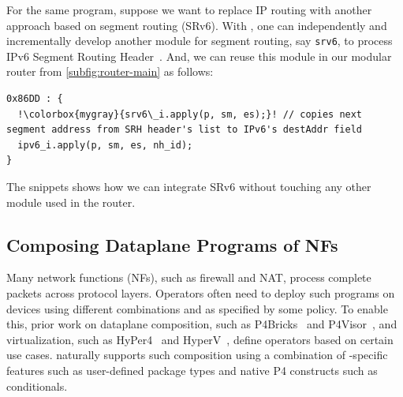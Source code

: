 \documentclass[letterpaper,twocolumn,10pt]{article}
\begin{document}
%
For the same program, suppose we want to replace IP routing with
another approach based on segment routing (SRv6). With \ulang, one can
independently and incrementally develop another module for segment
routing, say \texttt{srv6}, to process IPv6 Segment Routing
Header~\cite{srh}. And, we can reuse this module in our modular router
from \cref{subfig:router-main} as follows:

\begin{lstlisting}[frame=none, escapechar=!]
0x86DD : {
  !\colorbox{mygray}{srv6\_i.apply(p, sm, es);}! // copies next segment address from SRH header's list to IPv6's destAddr field
  ipv6_i.apply(p, sm, es, nh_id);
}
\end{lstlisting}
The snippets shows how we can integrate SRv6 without touching any
other module used in the router.




\subsection{Composing Dataplane Programs of NFs}
\label{subsection:composing-dataplane-programs-of-NFs}

Many network functions (NFs), such as firewall and NAT, process
complete packets across protocol layers. Operators often need to
deploy such programs on devices using different combinations and as
specified by some policy. To enable this, prior work on dataplane
composition, such as P4Bricks~\cite{soni:hal-01632431} and
P4Visor~\cite{Zheng:2018:PLV:3281411.3281436}, and virtualization,
such as HyPer4~\cite{Hancock:2016:HUP:2999572.2999607} and
HyperV~\cite{8038396}, define operators based on certain use cases.
\ulang naturally supports such composition using a combination of
\ulang-specific features such as user-defined package types and native
P4 constructs such as conditionals.
\end{document}
